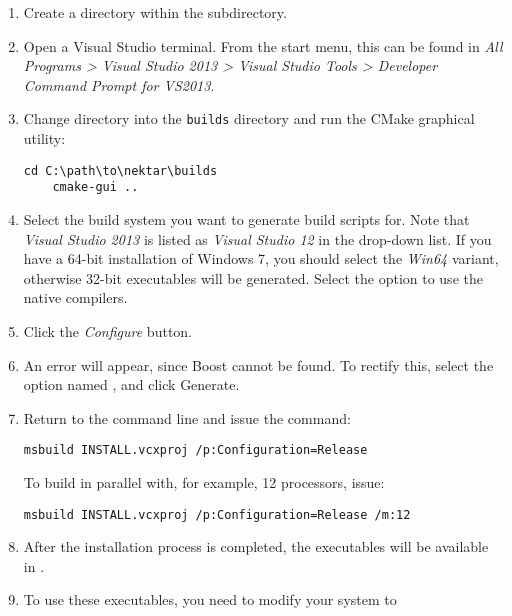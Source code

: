 \begin{enumerate}
  \begin{notebox}
    Some Windows versions do not recognise the path of a folder which has
    \inltt{++} in the name. If you think that your Windows version can not
    handle path containing special characters, you should rename
     to .
  \end{notebox}
  \item Create a  directory within the 
  subdirectory.
  \item Open a Visual Studio terminal. From the start menu, this can be found in
  \emph{All Programs > Visual Studio 2013 > Visual Studio Tools > Developer
    Command Prompt for VS2013}.
  \item Change directory into the \texttt{builds} directory and run the CMake
  graphical utility:
  \begin{lstlisting}[style=BashInputStyle]
    cd C:\path\to\nektar\builds
    cmake-gui ..
  \end{lstlisting}
  \item Select the build system you want to generate build scripts for. Note
  that \emph{Visual Studio 2013} is listed as \emph{Visual Studio 12} in the
  drop-down list. If you have a 64-bit installation of Windows 7, you should
  select the \emph{Win64} variant, otherwise 32-bit executables will be
  generated. Select the option to use the native compilers.
  \item Click the \emph{Configure} button.
  \item An error will appear, since Boost cannot be found. To rectify this,
  select the option named , and click Generate.
  \item Return to the command line and issue the command:
  \begin{lstlisting}[style=BashInputStyle]
    msbuild INSTALL.vcxproj /p:Configuration=Release
  \end{lstlisting}
  To build in parallel with, for example, 12 processors, issue:
  \begin{lstlisting}[style=BashInputStyle]
    msbuild INSTALL.vcxproj /p:Configuration=Release /m:12
  \end{lstlisting}
  \item After the installation process is completed, the executables will be
  available in .
  \item To use these executables, you need to modify your system  to

\end{enumerate}
